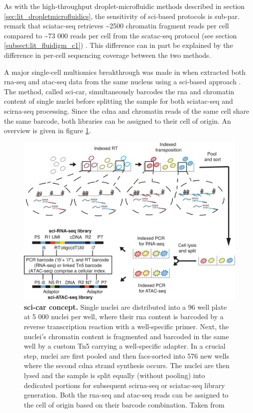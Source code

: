 As with the high-throughput droplet-microfluidic methods described in section \ref{sec:lit_dropletmicrofluidics}, the sensitivity of \acrshort{sci}-based protocols is sub-par. \citeauthor{fiers2018} remark that \acrshort{sciatac-seq} retrieves \textasciitilde{}2500 chromatin fragment reads per cell compared to \textasciitilde{}73 000 reads per cell from the \citeauthor{buenrostro2015} \acrshort{scatac-seq} protocol (see section \ref{subsect:lit_fluidigm_c1}) \citep{fiers2018}. This difference can in part be explained by the difference in per-cell sequencing coverage between the two methods.\pms

A major single-cell multiomics breakthrough was made in \citeyear{cao2018} when \citeauthor{cao2018} extracted both \acrshort{rna-seq} and \acrshort{atac-seq} data from the same nucleus using a \acrshort{sci}-based approach \citep{cao2018}. The method, called \acrfull{sci-car}, simultaneously barcodes the \acrshort{rna} and chromatin content of single nuclei before splitting the sample for both \acrshort{sciatac-seq} and \acrshort{scirna-seq} processing. Since the \acrshort{cdna} and chromatin reads of the same cell share the same barcode, both libraries can be assigned to their cell of origin. An overview is given in figure \ref{fig:cao2018}.\pms

\begin{figure}[ht]
	\centerfloat
	\includegraphics[width=\textwidth]{./ims/shendure2018.png}
	\caption[sci-CAR concept]{\textbf{\Acrshort{sci-car} concept.} Single nuclei are distributed into a 96 well plate at 5 000 nuclei per well, where their \acrshort{rna} content is barcoded by a reverse transcription reaction with a well-specific primer. Next, the nuclei's chromatin content is fragmented and barcoded in the same well by a custom Tn5 carrying a well-specific adapter. In a crucial step, nuclei are first pooled and then \acrshort{facs}-sorted into 576 new wells where the second \acrshort{cdna} strand synthesis occurs. The nuclei are then lysed and the sample is split equally (without pooling) into dedicated portions for subsequent \acrshort{scirna-seq} or \acrshort{sciatac-seq} library generation. Both the \acrshort{rna-seq} and \acrshort{atac-seq} reads can be assigned to the cell of origin based on their barcode combination. Taken from \cite{cao2018}}
	\label{fig:cao2018}
\end{figure}

